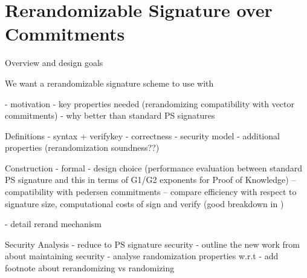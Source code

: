 % 
% 















% 
% 
\newpage
\section{Rerandomizable Signature over Commitments}
Overview and design goals

We want a rerandomizable signature scheme to use with 









- motivation
- key properties needed (rerandomizing compatibility with vector commitments)
- why better than standard PS signatures

Definitions
- syntax + verifykey
- correctness
- security model
- additional properties (rerandomization soundness??)

Construction
- formal
- design choice (performance evaluation between standard PS signature and this in terms of G1/G2 exponents for Proof of Knowledge)
-- compatibility with pedersen commitments
-- compare efficiency with respect to signature size, computational costs of sign and verify (good breakdown in \cite{hutchison_get_2010})


- detail rerand mechanism

Security Analysis
- reduce to PS signature security
- outline the new work from \cite{smart_reassessing_2018} about maintaining security
- analyse randomization properties w.r.t 
- add footnote about rerandomizing vs randomizing














